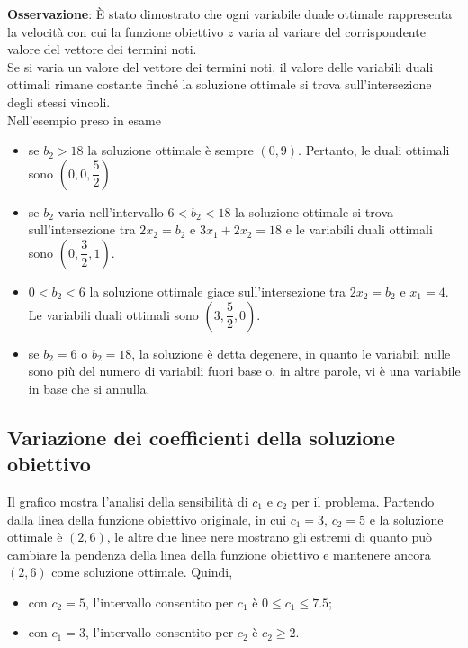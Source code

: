 \documentclass[a4paper]{extarticle}
\begin{document}
\vspace{2em}
\noindent
\textbf{Osservazione}: È stato dimostrato che ogni variabile duale ottimale rappresenta la velocità con cui la funzione obiettivo $z$ varia al variare del corrispondente valore del vettore dei termini noti.\\
Se si varia un valore del vettore dei termini noti, il valore delle variabili duali ottimali rimane costante finché la soluzione ottimale si trova sull'intersezione degli stessi vincoli.\\
Nell'esempio preso in esame
\begin{itemize}
    \item se $b_2 > 18$ la soluzione ottimale è sempre $(0,9)$. Pertanto, le duali ottimali sono $\left(0, 0, \dfrac{5}{2}\right)$
    \item se $b_2$ varia nell'intervallo $6 < b_2 < 18$ la soluzione ottimale si trova sull'intersezione tra $2x_2 = b_2$ e $3x_1 + 2x_2 = 18$ e le variabili duali ottimali sono $\left(0, \dfrac{3}{2}, 1\right)$.
    \item $0 < b_2 < 6$ la soluzione ottimale giace sull'intersezione tra $2x_2 = b_2$ e $x_1 = 4$. Le variabili duali ottimali sono $\left(3, \dfrac{5}{2}, 0 \right)$.
    \item se $b_2 = 6$ o $b_2 = 18$, la soluzione è detta degenere, in quanto le variabili nulle sono più del numero di variabili fuori base o, in altre parole, vi è una variabile in base che si annulla.
\end{itemize}

\vspace{1em}
\noindent
\subsection{Variazione dei coefficienti della soluzione obiettivo}
Il grafico mostra l'analisi della sensibilità di $c_1$ e $c_2$ per il problema. Partendo dalla linea della funzione obiettivo originale, in cui $c_1 = 3$, $c_2 = 5$ e la soluzione ottimale è $(2,6)$, le altre due linee nere mostrano gli estremi di quanto può cambiare la pendenza della linea della funzione obiettivo e mantenere ancora $(2,6)$ come soluzione ottimale. Quindi,
\begin{itemize}
    \item con $c_2 = 5$, l'intervallo consentito per $c_1$ è $0 \leq c_1 \leq 7.5$;
    \item con $c_1 = 3$, l'intervallo consentito per $c_2$ è $c_2 \geq 2$.
\end{itemize}
\end{document}

